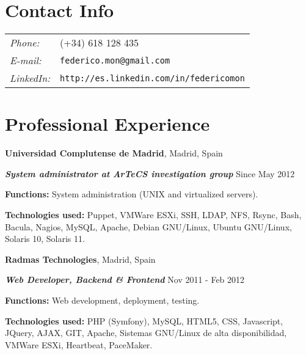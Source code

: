 \documentclass[margin,line]{resume}
\begin{document}
\address{Computer Engineer, Software Developer}

\begin{resume}
\vspace{+.2in}
\section{\sc Contact Info}
\vspace{.07in}
\begin{tabular}{@{}p{0.5in}p{2in}}
{\it Phone:} &(+34) 618 128 435 \\
{\it E-mail:} &{ \tt federico.mon@gmail.com}\\
{\it LinkedIn:} &{ \tt http://es.linkedin.com/in/federicomon}\\
\end{tabular}

\vspace{+.2in}
\section{\sc Professional Experience}
{\bf Universidad Complutense de Madrid}, Madrid, Spain

\vspace{-.2cm}
{\bf \em System administrator at ArTeCS investigation group} \hfill
{ Since May 2012
}
\begin{list2}
\vspace*{.06in}
\item {\bf Functions: }{System administration (UNIX and virtualized 
        servers).}
\item {\bf Technologies used: }{Puppet, VMWare ESXi, SSH, LDAP, NFS, Rsync, 
        Bash, Bacula, Nagios, MySQL, Apache, 
        Debian GNU/Linux, Ubuntu GNU/Linux, 
        Solaris 10, Solaris 11.}
\end{list2}

\vspace{+.05in}
{\bf Radmas Technologies}, Madrid, Spain

\vspace{-.2cm}
{\bf \em Web Developer, Backend \& Frontend} \hfill
{ Nov 2011 - Feb 2012
}

\begin{list2}
\vspace*{.06in}
\item {\bf Functions: }{Web development, deployment, testing.}
\item {\bf Technologies used: }{PHP (Symfony), MySQL, HTML5, CSS,
Javascript, JQuery, AJAX, GIT, Apache, Sistemas GNU/Linux de alta
disponibilidad, VMWare ESXi, Heartbeat, PaceMaker.}
\end{list2}


\end{resume}
\end{document}
